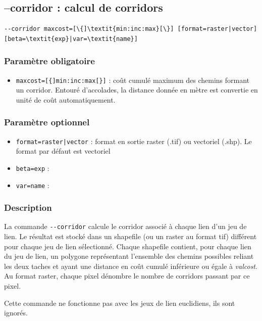 \documentclass[a4paper,10pt]{report}
\begin{document}
\subsection{--corridor : calcul de corridors}
\begin{Verbatim}[commandchars=\\\{\}]
--corridor maxcost=[\{]\textit{min:inc:max}[\}] [format=raster|vector] [beta=\textit{exp}|var=\textit{name}]
\end{Verbatim}

\subsubsection{Paramètre obligatoire}
\begin{itemize}
	\item \verb|maxcost=[{]min:inc:max[}]| : coût cumulé maximum des chemins formant un corridor. Entouré d'accolades, la distance donnée en mètre est convertie en unité de coût automatiquement.
\end{itemize}

\subsubsection{Paramètre optionnel}
\begin{itemize}
	\item \verb+format=raster|vector+ : format en sortie raster (.tif) ou vectoriel (.shp). Le format par défaut est vectoriel
	\item \verb|beta=exp| : 
	\item \verb|var=name| : 	
\end{itemize}

\subsubsection{Description}
La commande \verb|--corridor| calcule le corridor associé à chaque lien d'un jeu de lien.
Le résultat est stocké dans un shapefile (ou un raster au format tif) différent pour chaque jeu de lien sélectionné. Chaque shapefile contient, pour chaque lien du jeu de lien, un polygone représentant l'ensemble des chemins possibles reliant les deux taches et ayant une distance en coût cumulé inférieure ou égale à \textit{valcost}.
Au format raster, chaque pixel dénombre le nombre de corridors passant par ce pixel.

Cette commande ne fonctionne pas avec les jeux de lien euclidiens, ils sont ignorés.
\end{document}
